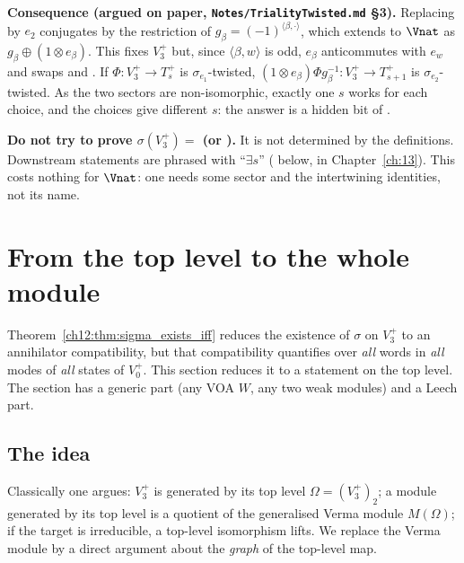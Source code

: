\textbf{Consequence (argued on paper, \texttt{Notes/TrialityTwisted.md} §3).}  Replacing  by $e_2$
conjugates  by the restriction of $g_\beta=(-1)^{\langle\beta,\cdot\rangle}$, which extends to $\Vnat$
as $g_\beta\oplus(1\otimes e_\beta)$.  This fixes $V_3^+$ but, since $\langle\beta,w\rangle$ is odd, $e_\beta$
anticommutes with $e_w$ and swaps  and .  If $\Phi:V_3^+\to T_s^+$ is
$\sigma_{e_1}$-twisted, $(1\otimes e_\beta)\Phi g_\beta^{-1}:V_3^+\to T_{s+1}^+$ is $\sigma_{e_2}$-twisted.  As the two
sectors are non-isomorphic, exactly one $s$ works for each choice, and the choices give different $s$:
the answer is a hidden bit of .

\begin{warning}
\textbf{Do not try to prove $\sigma(V_3^+)=$  (or ).}  It is not determined
by the definitions.  Downstream statements are phrased with ``$\exists s$'' (
below,  in Chapter~\ref{ch:13}).  This costs nothing for $\Vnat$: one needs some sector
and the intertwining identities, not its name.
\end{warning}

\section{From the top level to the whole module}\label{ch12:sec:top}

Theorem~\ref{ch12:thm:sigma_exists_iff} reduces the existence of $\sigma$ on $V_3^+$ to an
annihilator compatibility, but that compatibility quantifies over \emph{all} words in \emph{all}
modes of \emph{all} states of $V_0^+$.  This section reduces it to a statement on the top level.
The section has a generic part (any VOA $W$, any two weak modules) and a Leech part.

\subsection{The idea}

Classically one argues: $V_3^+$ is generated by its top level $\Omega=(V_3^+)_2$; a module
generated by its top level is a quotient of the generalised Verma module $M(\Omega)$; if the target
is irreducible, a top-level isomorphism lifts.  We replace the Verma module by a direct argument
about the \emph{graph} of the top-level map.


